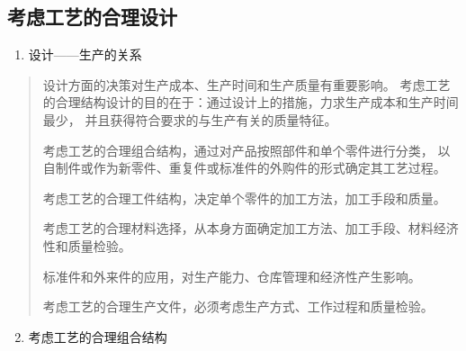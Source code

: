 \documentclass[letterpaper,10pt,english]{sphinxmanual}
\begin{document}
\subsection{考虑工艺的合理设计}
\label{unit6:id20}\begin{enumerate}
\item {} 
设计——生产的关系

\end{enumerate}
\begin{quote}

设计方面的决策对生产成本、生产时间和生产质量有重要影响。
考虑工艺的合理结构设计的目的在于：通过设计上的措施，力求生产成本和生产时间最少，
并且获得符合要求的与生产有关的质量特征。

考虑工艺的合理组合结构，通过对产品按照部件和单个零件进行分类，
以自制件或作为新零件、重复件或标准件的外购件的形式确定其工艺过程。

考虑工艺的合理工件结构，决定单个零件的加工方法，加工手段和质量。

考虑工艺的合理材料选择，从本身方面确定加工方法、加工手段、材料经济性和质量检验。

标准件和外来件的应用，对生产能力、仓库管理和经济性产生影响。

考虑工艺的合理生产文件，必须考虑生产方式、工作过程和质量检验。
\end{quote}
\begin{enumerate}
\setcounter{enumi}{1}
\item {} 
考虑工艺的合理组合结构

\end{enumerate}
\end{document}
